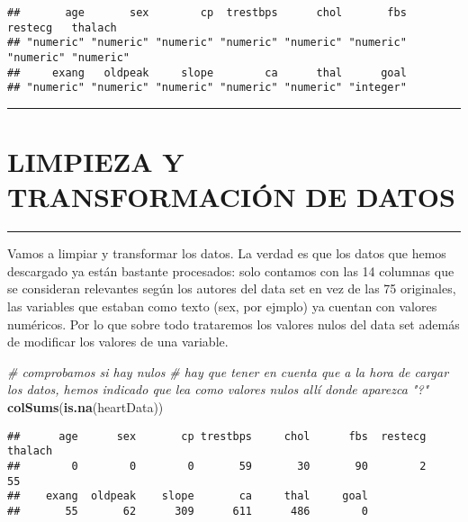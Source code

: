 \documentclass[
]{article}
\newenvironment{Shaded}{\begin{snugshade}}{\end{snugshade}}
\newcommand{\CommentTok}[1]{\textcolor[rgb]{0.56,0.35,0.01}{\textit{#1}}}
\newcommand{\KeywordTok}[1]{\textcolor[rgb]{0.13,0.29,0.53}{\textbf{#1}}}
\newcommand{\NormalTok}[1]{#1}
\begin{document}
\begin{verbatim}
##       age       sex        cp  trestbps      chol       fbs   restecg   thalach 
## "numeric" "numeric" "numeric" "numeric" "numeric" "numeric" "numeric" "numeric" 
##     exang   oldpeak     slope        ca      thal      goal 
## "numeric" "numeric" "numeric" "numeric" "numeric" "integer"
\end{verbatim}

\begin{center}\rule{0.5\linewidth}{0.5pt}\end{center}

\hypertarget{limpieza-y-transformaciuxf3n-de-datos}{%
\section{LIMPIEZA Y TRANSFORMACIÓN DE
DATOS}\label{limpieza-y-transformaciuxf3n-de-datos}}

\begin{center}\rule{0.5\linewidth}{0.5pt}\end{center}

Vamos a limpiar y transformar los datos. La verdad es que los datos que
hemos descargado ya están bastante procesados: solo contamos con las 14
columnas que se consideran relevantes según los autores del data set en
vez de las 75 originales, las variables que estaban como texto (sex, por
ejmplo) ya cuentan con valores numéricos. Por lo que sobre todo
trataremos los valores nulos del data set además de modificar los
valores de una variable.

\begin{Shaded}
\begin{Highlighting}[]
\CommentTok{# comprobamos si hay nulos}
\CommentTok{# hay que tener en cuenta que a la hora de cargar los datos, hemos indicado que lea como valores nulos allí donde aparezca "?"}
\KeywordTok{colSums}\NormalTok{(}\KeywordTok{is.na}\NormalTok{(heartData)) }
\end{Highlighting}
\end{Shaded}

\begin{verbatim}
##      age      sex       cp trestbps     chol      fbs  restecg  thalach 
##        0        0        0       59       30       90        2       55 
##    exang  oldpeak    slope       ca     thal     goal 
##       55       62      309      611      486        0
\end{verbatim}
\end{document}
